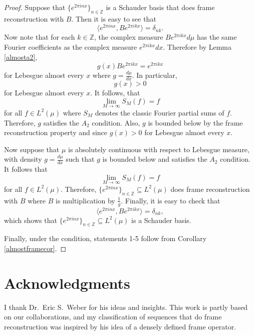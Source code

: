\documentclass[11pt]{amsart}
\theoremstyle{definition}
\numberwithin{equation}{section}
\begin{document}
\begin{proof}
Suppose that $\{ e^{2 \pi i n x} \}_{n \in \mathbb{Z}}$ is a Schauder basis that does frame reconstruction with $B$. Then it is easy to see that 
$$\langle e^{2 \pi i n x},  Be^{2 \pi i k x}\rangle=\delta_{nk}.$$ Now note that for each $k\in \mathbb{Z}$, the complex measure $Be^{2\pi i kx}d\mu$ has the same Fourier coefficients as the complex measure $e^{2\pi ikx}dx$. Therefore by Lemma \ref{almosta2},
$$g(x)Be^{2\pi ikx}=e^{2\pi ikx}$$ for Lebesgue almost every $x$ where $g = \tfrac{d\mu}{dx}$. In particular, $$g(x)>0$$ for Lebesgue almost every $x$. It follows, that $$\lim_{M\to \infty} S_{M}(f)=f$$ for all $f\in L^{2}(\mu)$ where $S_{M}$ denotes the classic Fourier partial sums of $f$. Therefore, $g$ satisfies the $A_{2}$ condition. Also, $g$ is bounded below by the frame reconstruction property and since $g(x)>0$ for Lebesgue almost every $x$.

Now suppose that $\mu$ is absolutely continuous with respect to Lebesgue measure, with density $g = \tfrac{d\mu}{dx}$ such that $g$ is bounded below and satisfies the $A_{2}$ condition. It follows that $$\lim_{M\to \infty} S_{M}(f)=f$$ for all $f\in L^{2}(\mu)$. Therefore, $\{ e^{2 \pi i n x} \}_{n \in \mathbb{Z}} \subseteq L^2(\mu)$ does frame reconstruction with $B$ where $B$ is multiplication by $\frac{1}{g}$. Finally, it is easy to check that $$\langle e^{2 \pi i n x},  Be^{2 \pi i k x}\rangle=\delta_{nk},$$ which shows that $\{ e^{2 \pi i n x} \}_{n \in \mathbb{Z}} \subseteq L^2(\mu)$ is a Schauder basis.

Finally, under the condition, statements 1-5 follow from Corollary \ref{almostframecor}.
\end{proof}

\section*{Acknowledgments}
I thank Dr.\ Eric S.\ Weber for his ideas and insights. This work is partly based on our collaborations, and my classification of sequences that do frame reconstruction was inspired by his idea of a densely defined frame operator.

\printbibliography
\end{document}
